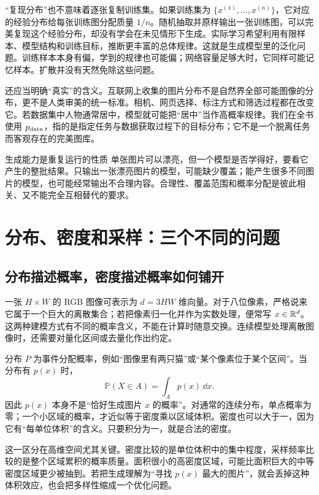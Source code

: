 “复现分布”也不意味着逐张复制训练集。如果训练集为 $\{x^{(1)},\ldots,x^{(n)}\}$，它对应的经验分布给每张训练图分配质量 $1/n$。随机抽取并原样输出一张训练图，可以完美复现这个经验分布，却没有学会在未见情形下生成。实际学习希望利用有限样本、模型结构和训练目标，推断更丰富的总体规律。这就是生成模型里的泛化问题。训练样本本身有偏，学到的规律也可能偏；网络容量足够大时，它同样可能记忆样本。扩散并没有天然免除这些问题。

还应当明确“真实”的含义。互联网上收集的图片分布不是自然界全部可能图像的分布，更不是人类审美的统一标准。相机、网页选择、标注方式和筛选过程都在改变它。若数据集中人物通常居中，模型就可能把“居中”当作高概率规律。我们在全书使用 $p_{\mathrm{data}}$，指的是指定任务与数据获取过程下的目标分布；它不是一个脱离任务而客观存在的完美图库。

\begin{intuitionbox}{生成能力是重复运行的性质}
单张图片可以漂亮，但一个模型是否学得好，要看它产生的整批结果。只输出一张漂亮图片的模型，可能缺少覆盖；能产生很多不同图片的模型，也可能经常输出不合理内容。合理性、覆盖范围和概率分配是彼此相关、又不能完全互相替代的要求。
\end{intuitionbox}

\section{分布、密度和采样：三个不同的问题}
\label{sec:c-distribution}

\subsection{分布描述概率，密度描述概率如何铺开}

一张 $H\times W$ 的 RGB 图像可表示为 $d=3HW$ 维向量。对于八位像素，严格说来它属于一个巨大的离散集合；若把像素归一化并作为实数处理，便常写 $x\in\mathbb{R}^d$。这两种建模方式有不同的概率含义，不能在计算时随意交换。连续模型处理离散图像时，还需要对量化区间或去量化作出约定。

分布 $P$ 为事件分配概率，例如“图像里有两只猫”或“某个像素位于某个区间”。当分布有 $p(x)$ 时，
\[
  \mathbb P(X\in A)=\int_A p(x)\,\dd x.
\]
因此 $p(x)$ 本身不是“恰好生成图片 $x$ 的概率”。对通常的连续分布，单点概率为零；一个小区域的概率，才近似等于密度乘以区域体积。密度也可以大于一，因为它有“每单位体积”的含义。只要积分为一，就是合法的密度。

这一区分在高维空间尤其关键。密度比较的是单位体积中的集中程度，采样频率比较的是整个区域累积的概率质量。面积很小的高密度区域，可能比面积巨大的中等密度区域更少被抽到。若把生成理解为“寻找 $p(x)$ 最大的图片”，就会丢掉这种体积效应，也会把多样性缩成一个优化问题。

